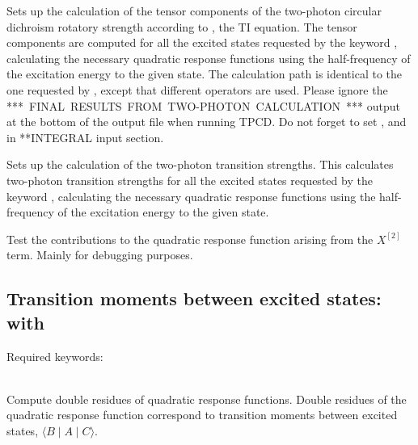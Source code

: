 \begin{description}
\item{}
Sets up the calculation of the tensor components of the two-photon circular dichroism rotatory
strength according to \cite{Rizzo:TPACD}, the TI equation.
The tensor components are computed for all the excited states
requested by the keyword , calculating the necessary
quadratic response functions using the half-frequency of the
excitation energy to the given state. The calculation path is identical to the
one requested by , except that different operators are used.
Please ignore the \mbox{***~FINAL~RESULTS~FROM~TWO-PHOTON~CALCULATION~***} output
at the bottom of the output file when running TPCD.
Do not forget to set ,  and  in **INTEGRAL
input section.


\item{}
Sets up the calculation of the two-photon transition strengths. This
calculates two-photon transition strengths for all the excited states
requested by the keyword , calculating the necessary quadratic response functions using the half-frequency of the
excitation energy to the given state.

\item{}
Test the contributions to the quadratic response function arising from
the $X^{\left[2\right]}$ term. Mainly for debugging purposes.
\end{description}


\subsection{Transition moments between excited states:  with }

Required keywords:

\begin{description}

\item{}\\
Compute double residues of quadratic
response functions.
Double residues of the quadratic response function correspond to transition
moments between excited states,
$\langle B \mid A \mid C \rangle$.

\end{description}

